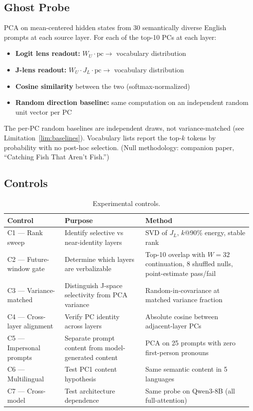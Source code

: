 \documentclass[11pt,a4paper]{article}
\begin{document}
\subsection{Ghost Probe}

PCA on mean-centered hidden states from 30 semantically diverse English prompts at each source layer. For each of the top-10 PCs at each layer:

\begin{itemize}
  \item \textbf{Logit lens readout:} $W_U \cdot \text{pc} \rightarrow$ vocabulary distribution
  \item \textbf{J-lens readout:} $W_U \cdot J_L \cdot \text{pc} \rightarrow$ vocabulary distribution
  \item \textbf{Cosine similarity} between the two (softmax-normalized)
  \item \textbf{Random direction baseline:} same computation on an independent random unit vector per PC
\end{itemize}

The per-PC random baselines are independent draws, not variance-matched (see Limitation~\ref{lim:baselines}). Vocabulary lists report the top-$k$ tokens by probability with no post-hoc selection. (Null methodology: companion paper, ``Catching Fish That Aren't Fish.'')

\subsection{Controls}

\begin{table}[H]
\centering
\caption{Experimental controls.}
\label{tab:controls}
\small
\begin{tabular}{p{3.2cm}p{4.8cm}p{5.8cm}}
\toprule
Control & Purpose & Method \\
\midrule
C1 --- Rank sweep & Identify selective vs near-identity layers & SVD of $J_L$, $k$@90\% energy, stable rank \\
C2 --- Future-window gate & Determine which layers are verbalizable & Top-10 overlap with $W = 32$ continuation, 8 shuffled nulls, point-estimate pass/fail \\
C3 --- Variance-matched & Distinguish J-space selectivity from PCA variance & Random-in-covariance at matched variance fraction \\
C4 --- Cross-layer alignment & Verify PC identity across layers & Absolute cosine between adjacent-layer PCs \\
C5 --- Impersonal prompts & Separate prompt content from model-generated content & PCA on 25 prompts with zero first-person pronouns \\
C6 --- Multilingual & Test PC1 content hypothesis & Same semantic content in 5 languages \\
C7 --- Cross-model & Test architecture dependence & Same probe on Qwen3-8B (all full-attention) \\
\bottomrule
\end{tabular}
\end{table}
\end{document}
